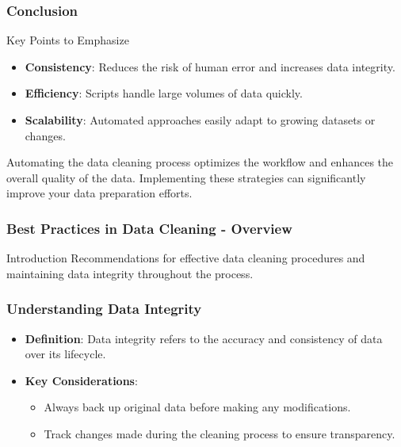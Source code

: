 \documentclass[aspectratio=169]{beamer}
\begin{document}
\begin{frame}
    \frametitle{Conclusion}
    \begin{block}{Key Points to Emphasize}
        \begin{itemize}
            \item \textbf{Consistency}: Reduces the risk of human error and increases data integrity.
            \item \textbf{Efficiency}: Scripts handle large volumes of data quickly.
            \item \textbf{Scalability}: Automated approaches easily adapt to growing datasets or changes.
        \end{itemize}
    \end{block}
    
    Automating the data cleaning process optimizes the workflow and enhances the overall quality of the data. Implementing these strategies can significantly improve your data preparation efforts.
\end{frame}

\begin{frame}[fragile]
    \frametitle{Best Practices in Data Cleaning - Overview}
    \begin{block}{Introduction}
        Recommendations for effective data cleaning procedures and maintaining data integrity throughout the process.
    \end{block}
\end{frame}

\begin{frame}[fragile]
    \frametitle{Understanding Data Integrity}
    \begin{itemize}
        \item \textbf{Definition}: 
        Data integrity refers to the accuracy and consistency of data over its lifecycle. 
        \item \textbf{Key Considerations}:
        \begin{itemize}
            \item Always back up original data before making any modifications.
            \item Track changes made during the cleaning process to ensure transparency.
        \end{itemize}
    \end{itemize}
\end{frame}
\end{document}
